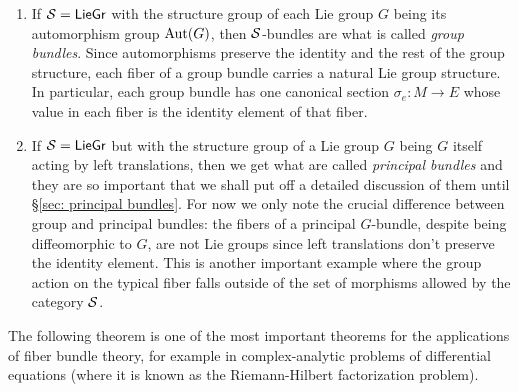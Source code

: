 \begin{example}
    \begin{enumerate}
        \item If $\mathcal{S}=\mathsf{LieGr}$ with the structure group of each Lie group $G$ being its automorphism group $\operatorname{Aut}(G)$, then $\mathcal{S}$-bundles are what is called \emph{group bundles}. Since automorphisms preserve the identity and the rest of the group structure, each fiber of a group bundle carries a natural Lie group structure. In particular, each group bundle has one canonical section $\sigma_e:M\to E$ whose value in each fiber is the identity element of that fiber.
        
        \item If $\mathcal{S}=\mathsf{LieGr}$ but with the structure group of a Lie group $G$ being $G$ itself acting by left translations, then we get what are called \emph{principal bundles} and they are so important that we shall put off a detailed discussion of them until \S\ref{sec: principal bundles}. For now we only note the crucial difference between group and principal bundles: the fibers of a principal $G$-bundle, despite being diffeomorphic to $G$, are not Lie groups since left translations don't preserve the identity element. This is another important example where the group action on the typical fiber falls outside of the set of morphisms allowed by the category $\mathcal{S}$.
    \end{enumerate}
\end{example}

The following theorem is one of the most important theorems for the applications of fiber bundle theory, for example in complex-analytic problems of differential equations (where it is known as the Riemann-Hilbert factorization problem).

